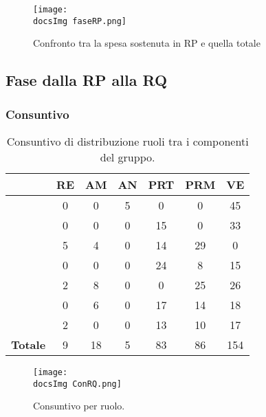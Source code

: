 {{{\begin{figure}[h!]
	\end{figure}
	\begin{figure}[h!]
	\centering
		\texttt{[image: \\docsImg faseRP.png]}
		\caption{Confronto tra la spesa sostenuta in RP e quella totale} 
	
	\end{figure}
	 }
	
	}
\newpage
	\subsection{Fase dalla RP alla RQ}{
	\subsubsection{Consuntivo}
	\begin{table}[h!]
		\begin{center}
			\begin{tabular}{l c c c c c c}				
				\toprule
				&	RE& AM& AN& PRT& PRM& VE \\ 
				\midrule
				\BM	&	0	&	0	&	5	&	0	&	0	&	45\\ 
				\BA	&	0	&	0	&	0	&	15	&	0	&	33\\
				\CD	&	5	&	4	&	0	&	14	&	29	&	0\\ 
				\LS	&	0	&	0	&	0	&	24	&	8	&	15\\
				\PV &	2	&	8	&	0	&	0	&	25	&	26\\
				\ZF 	&	0	&	6	&	0	&	17	&	14	&	18\\
				\ZE &	2	&	0	&	0	&	13	&	10	&	17\\ \hline
				\textbf{Totale}&	 9 &	18 &	5	&	83 	&	86 	& 154\\
				\bottomrule
			\end{tabular}	
		\caption{Consuntivo di distribuzione ruoli tra i componenti del gruppo.}
		\end{center}
	\end{table}

	\begin{figure}[h!]
	\centering
		\texttt{[image: \\docsImg ConRQ.png]}
		\caption{Consuntivo per ruolo.} 
	\end{figure}


	\begin{table}[h!]
		\begin{center}
			\renewcommand{\arraystretch}{1.5}%
			\begin{tabular}{c| c c c c c c c |c }
				

\end{tabular}
\end{center}
\end{table}}}
